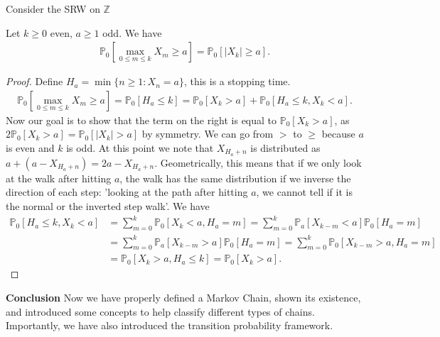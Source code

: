 Consider the SRW on $\mathbb{Z}$ 

\begin{prop}[]
Let $k\geq 0$ even, $a\geq1$ odd. We have 
\begin{align}
	\mathbb{P}_{0} \left[ \max_{0 \leq m \leq k} X_m \geq a \right] = \mathbb{P}_{0} \left[ |X_k|\geq a \right] . 
\end{align}

\end{prop}
\begin{proof}
	Define $H_a= \min\{n \geq 1: X_n =a\}$, this is a stopping time.
	\begin{align}
		\mathbb{P}_{0} \left[ \max_{0 \leq m \leq k}X_m \geq a \right] = \mathbb{P}_{0} \left[ H_a \leq k \right] = \mathbb{P}_{0} \left[ X_k > a \right]  + \mathbb{P}_{0} \left[ H_a \leq k, X_k < a \right] 
		.\end{align}		
	{\color{blue}
	Now our goal is to show that the term on the right is equal to $\mathbb{P}_{0} \left[ X_k > a \right] $, as $2\mathbb{P}_{0} \left[ X_k > a \right] = \mathbb{P}_{0} \left[ |X_k| >a \right] $ by symmetry. We can go from $>$ to $\geq$ because $a$ is even and $k$ is odd. At this point we note that $X_{H_a +n}$ is distributed as $a + (a-X_{H_a +n}) = 2a - X_{H_a +n}$. Geometrically, this means that if we only look at the walk after hitting $a$, the walk has the same distribution if we inverse the direction of each step: 'looking at the path after hitting $a$, we cannot tell if it is the normal or the inverted step walk'. We have}
	\begin{align}
		\mathbb{P}_{0} \left[ H_a \leq k, X_k < a \right] &= \sum_{m=0}^{k} \mathbb{P}_{0} \left[ X_k < a, H_a = m \right] = \sum_{m=0}^{k} \mathbb{P}_{a} \left[ X_{k-m} < a \right] \mathbb{P}_{0} \left[ H_a = m \right]  \\
		&= \sum_{m=0}^{k} \mathbb{P}_{a} \left[ X_{k-m}>a \right] \mathbb{P}_{0} \left[ H_a = m \right] = 
			 \sum_{m=0}^{k} \mathbb{P}_{0} \left[ X_{k-m}>a, H_a =m \right] \\
		&= \mathbb{P}_{0} \left[ X_k >a, H_a \leq k \right] = \mathbb{P}_{0} \left[ X_k > a \right]  
	 .\end{align}	
\end{proof}


\noindent
\textbf{Conclusion} Now we have properly defined a Markov Chain, shown its existence, and introduced some concepts to help classify different types of chains. Importantly, we have also introduced the transition probability framework. 


